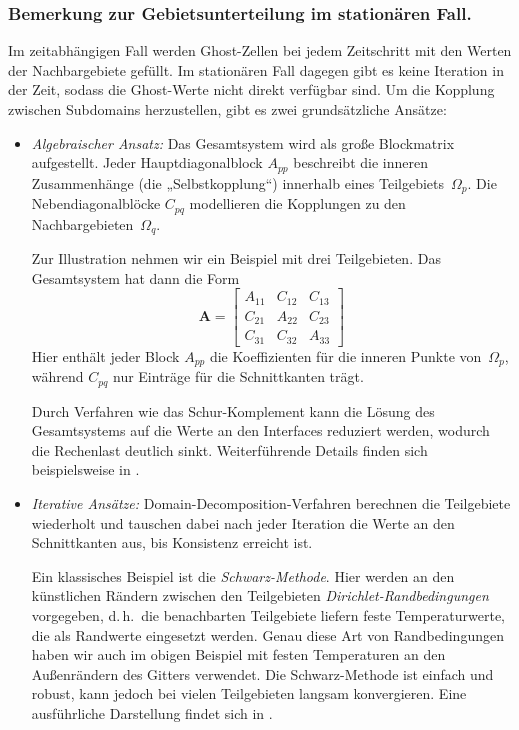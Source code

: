 \subsubsection*{Bemerkung zur Gebietsunterteilung im stationären Fall.}  
Im zeitabhängigen Fall werden Ghost-Zellen bei jedem Zeitschritt mit den Werten der Nachbargebiete gefüllt.  
Im stationären Fall dagegen gibt es keine Iteration in der Zeit, sodass die Ghost-Werte nicht direkt verfügbar sind.  
Um die Kopplung zwischen Subdomains herzustellen, gibt es zwei grundsätzliche Ansätze:

\begin{itemize}
	\item \emph{Algebraischer Ansatz:}  
	Das Gesamtsystem wird als große Blockmatrix aufgestellt.  
	Jeder Hauptdiagonalblock \(A_{pp}\) beschreibt die inneren Zusammenhänge (die „Selbstkopplung“) innerhalb eines Teilgebiets~\(\Omega_p\).  
	Die Nebendiagonalblöcke \(C_{pq}\) modellieren die Kopplungen zu den Nachbargebieten~\(\Omega_q\).  
	
	Zur Illustration nehmen wir ein Beispiel mit drei Teilgebieten.  
	Das Gesamtsystem hat dann die Form
	\[
	\mathbf{A} =
	\begin{bmatrix}
		A_{11} & C_{12} & C_{13} \\
		C_{21} & A_{22} & C_{23} \\
		C_{31} & C_{32} & A_{33}
	\end{bmatrix}
	\]
	Hier enthält jeder Block \(A_{pp}\) die Koeffizienten für die inneren Punkte von~\(\Omega_p\), 
	während \(C_{pq}\) nur Einträge für die Schnittkanten trägt.  
	
	Durch Verfahren wie das Schur-Komplement kann die Lösung des Gesamtsystems auf die Werte an den Interfaces reduziert werden, 
	wodurch die Rechenlast deutlich sinkt.  
	Weiterführende Details finden sich beispielsweise in \cite{parallelisierung:smith1996}.
	
	\item \emph{Iterative Ansätze:}  
	Domain-Decomposition-Verfahren berechnen die Teilgebiete wiederholt und tauschen dabei nach jeder Iteration die Werte an den Schnittkanten aus, bis Konsistenz erreicht ist.  
	
	Ein klassisches Beispiel ist die \emph{Schwarz-Methode}.  
	Hier werden an den künstlichen Rändern zwischen den Teilgebieten \emph{Dirichlet-Randbedingungen} vorgegeben, d.\,h.\ die benachbarten Teilgebiete liefern feste Temperaturwerte, die als Randwerte eingesetzt werden.  
	Genau diese Art von Randbedingungen haben wir auch im obigen Beispiel mit festen Temperaturen an den Außenrändern des Gitters verwendet.  
	Die Schwarz-Methode ist einfach und robust, kann jedoch bei vielen Teilgebieten langsam konvergieren.  
	Eine ausführliche Darstellung findet sich in \cite{parallelisierung:quarteroniValli1999}.  
	

\end{itemize}
